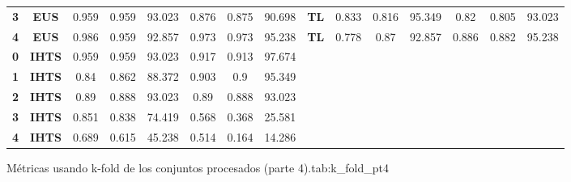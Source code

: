 {{\begin{tabular}{c|c|cccccc|ccccccc}
\textbf{3} & \textbf{EUS} & 0.959 & 0.959 & 93.023 & 0.876 & 0.875 & 90.698 & \multicolumn{1}{c|}{\textbf{TL}} & 0.833 & 0.816 & 95.349 & 0.82  & 0.805 & 93.023 \\
\textbf{4} & \textbf{EUS} & 0.986 & 0.959 & 92.857 & 0.973 & 0.973 & 95.238 & \multicolumn{1}{c|}{\textbf{TL}} & 0.778 & 0.87  & 92.857 & 0.886 & 0.882 & 95.238 \\
\textbf{0} & \textbf{IHTS} & 0.959 & 0.959 & 93.023 & 0.917 & 0.913 & 97.674 &       &       &       &       &       &       &  \\
\textbf{1} & \textbf{IHTS} & 0.84  & 0.862 & 88.372 & 0.903 & 0.9   & 95.349 &       &       &       &       &       &       &  \\
\textbf{2} & \textbf{IHTS} & 0.89  & 0.888 & 93.023 & 0.89  & 0.888 & 93.023 &       &       &       &       &       &       &  \\
\textbf{3} & \textbf{IHTS} & 0.851 & 0.838 & 74.419 & 0.568 & 0.368 & 25.581 &       &       &       &       &       &       &  \\
\textbf{4} & \textbf{IHTS} & 0.689 & 0.615 & 45.238 & 0.514 & 0.164 & 14.286 &       &       &       &       &       &       &  \\
\end{tabular}}}{Métricas usando k-fold de los conjuntos procesados (parte 4).}{tab:k_fold_pt4}

